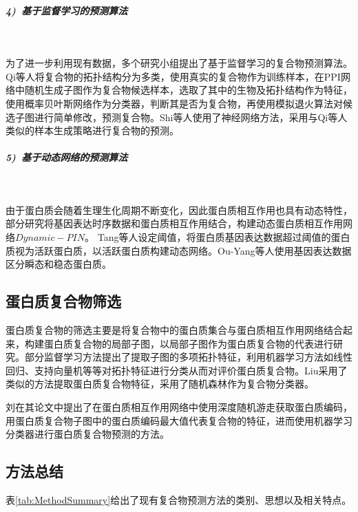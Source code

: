 \subparagraph*{4)~基于监督学习的预测算法} ~

为了进一步利用现有数据，多个研究小组提出了基于监督学习的复合物预测算法。Qi等人\cite{qi_protein_2008}将复合物的拓扑结构分为多类，使用真实的复合物作为训练样本，在PPI网络中随机生成子图作为复合物候选样本，选取了其中的生物及拓扑结构作为特征，使用概率贝叶斯网络作为分类器，判断其是否为复合物，再使用模拟退火算法对候选子图进行简单修改，预测复合物。Shi等人\cite{shi_protein_2011}使用了神经网络方法，采用与Qi等人类似的样本生成策略进行复合物的预测。

\subparagraph*{5)~基于动态网络的预测算法} ~

由于蛋白质会随着生理生化周期不断变化，因此蛋白质相互作用也具有动态特性，部分研究\cite{li_dynamic_2017}将基因表达时序数据和蛋白质相互作用结合，构建动态蛋白质相互作用网络$Dynamic-PIN$。
Tang等人\cite{tang_comparison_2011}设定阈值，将蛋白质基因表达数据超过阈值的蛋白质视为活跃蛋白质，以活跃蛋白质构建动态网络。Ou-Yang等人\cite{ou-yang_detecting_2014}使用基因表达数据区分瞬态和稳态蛋白质。

\subsection{蛋白质复合物筛选}
\label{subsection:research:Selection}

蛋白质复合物的筛选主要是将复合物中的蛋白质集合与蛋白质相互作用网络结合起来，构建蛋白质复合物的局部子图，以局部子图作为蛋白质复合物的代表进行研究。部分监督学习方法\cite{dong_predicting_2018}提出了提取子图的多项拓扑特征，利用机器学习方法如线性回归、支持向量机等等对拓扑特征进行分类从而对评价蛋白质复合物。Liu\cite{liu_identifying_2018}采用了类似的方法提取蛋白质复合物特征，采用了随机森林作为复合物分类器。

刘\cite{liu_protein_2018}在其论文中提出了在蛋白质相互作用网络中使用深度随机游走获取蛋白质编码，用蛋白质复合物子图中的蛋白质编码最大值代表复合物的特征，进而使用机器学习分类器进行蛋白质复合物预测的方法。

\subsection{方法总结}
\label{subsection:research:researchSummary}

表\ref{tab:MethodSummary}给出了现有复合物预测方法的类别、思想以及相关特点。

